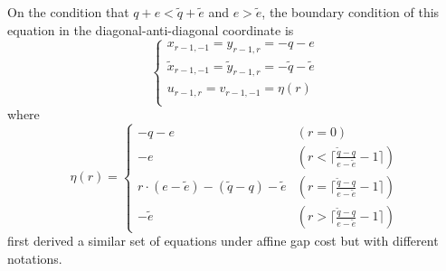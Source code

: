 \documentclass{bioinfo}
\begin{document}
\begin{methods}
On the condition that $q+e<\tilde{q}+\tilde{e}$ and $e>\tilde{e}$, the boundary
condition of this equation in the diagonal-anti-diagonal coordinate is
\[
\left\{\begin{array}{l}
x_{r-1,-1}=y_{r-1,r}=-q-e\\
\tilde{x}_{r-1,-1}=\tilde{y}_{r-1,r}=-\tilde{q}-\tilde{e}\\
u_{r-1,r}=v_{r-1,-1}=\eta(r)\\
\end{array}\right.
\]
where
\[
\eta(r)=\left\{\begin{array}{ll}
-q-e & (r=0) \\
-e & (r<\lceil\frac{\tilde{q}-q}{e-\tilde{e}}-1\rceil) \\
r\cdot(e-\tilde{e})-(\tilde{q}-q)-\tilde{e} & (r=\lceil\frac{\tilde{q}-q}{e-\tilde{e}}-1\rceil) \\
-\tilde{e} & (r>\lceil\frac{\tilde{q}-q}{e-\tilde{e}}-1\rceil)
\end{array}\right.
\]
\citet{Suzuki:2016} first derived a similar set of equations under affine gap
cost but with different notations.
\end{methods}
\end{document}
